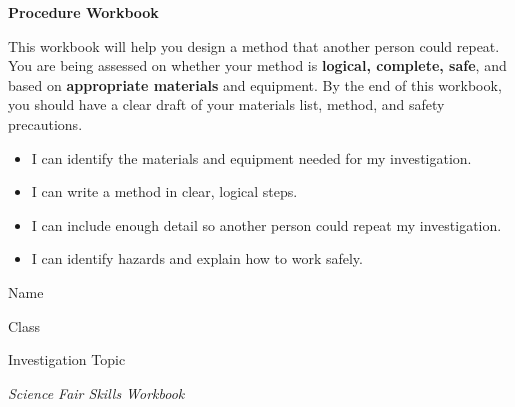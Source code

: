 \documentclass[12pt]{article}
\begin{document}
\thispagestyle{empty}

\vspace*{2cm}

\begin{center}
    {\Huge \textbf{Procedure Workbook}}\\[1em]
\end{center}

\vspace{2em}

\begin{purposebox}
This workbook will help you design a method that another person could repeat. You are being assessed on whether your method is \textbf{logical, complete, safe}, and based on \textbf{appropriate materials} and equipment. By the end of this workbook, you should have a clear draft of your materials list, method, and safety precautions.
\end{purposebox}

\begin{successbox}
\begin{itemize}[leftmargin=1.5em]
    \item I can identify the materials and equipment needed for my investigation.
    \item I can write a method in clear, logical steps.
    \item I can include enough detail so another person could repeat my investigation.
    \item I can identify hazards and explain how to work safely.
\end{itemize}
\end{successbox}

\begin{studentbox}{Name}
\hspace{0.95\textwidth}
\end{studentbox}

\begin{studentbox}{Class}
\hspace{0.95\textwidth}
\end{studentbox}

\begin{studentbox}{Investigation Topic}
\hspace{0.95\textwidth}
\end{studentbox}

\vfill

\begin{center}
\textit{Science Fair Skills Workbook}
\end{center}
\end{document}
